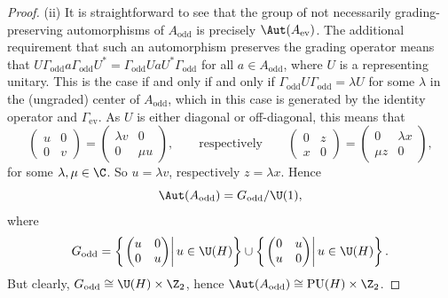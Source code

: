 \begin{proof}
(ii) It is straightforward to see that the group of not necessarily grading-preserving automorphisms of $A_{\mathrm{odd}}$ is precisely $\Aut(A_{\mathrm{ev}})$.
The additional requirement that such an automorphism preserves the grading operator means that $U \Gamma_{\mathrm{odd}} a \Gamma_{\mathrm{odd}} U^* = \Gamma_{\mathrm{odd}} U a U^* \Gamma_{\mathrm{odd}}$ for all $a \in A_{\mathrm{odd}}$, where $U$ is a representing unitary.
This is the case if and only if and only if $\Gamma_{\mathrm{odd}} U \Gamma_{\mathrm{odd}} = \lambda U$ for some $\lambda$ in the (ungraded) center of $A_{\mathrm{odd}}$, which in this case is generated by the identity operator and $\Gamma_{\mathrm{ev}}$.
As $U$ is either diagonal or off-diagonal, this means that
 \begin{equation*}
 	\begin{pmatrix} u & 0 \\ 0 & v \end{pmatrix} = \begin{pmatrix} \lambda v & 0 \\ 0 & \mu u \end{pmatrix}, \qquad \text{respectively} \qquad \begin{pmatrix} 0 & z \\ x & 0 \end{pmatrix} = \begin{pmatrix} 0 & \lambda x \\ \mu z& 0 \end{pmatrix},
 \end{equation*}
 for some $\lambda, \mu \in \C$.
 So $u = \lambda v$, respectively $z = \lambda x$.
 Hence
\begin{equation*} %
 \Aut(A_{\mathrm{odd}}) = G_{\mathrm{odd}} / \U(1),
\end{equation*}
where
\begin{equation} \label{DefGodd}
 G_{\mathrm{odd}} = \left\{ \left.\begin{pmatrix} u & 0 \\ 0 & u \end{pmatrix} \right| u \in \U(H)\right\} \cup \left\{ \left.\begin{pmatrix} 0 & u \\ u & 0 \end{pmatrix} \right| u \in \U(H)\right\}.
\end{equation}
But clearly, $G_{\mathrm{odd}} \cong \U(H) \times \Z_2$, hence $\Aut(A_{\mathrm{odd}}) \cong \mathrm{PU}(H) \times \Z_2$.
\end{proof}


